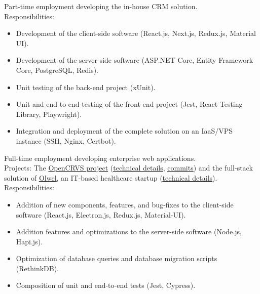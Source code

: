 \documentclass[10pt,a4paper,ragged2e]{altacv}
\begin{document}
\small Part-time employment developing the in-house CRM solution.\\
\smallskip
Responsibilities:
\begin{itemize}
\item Development of the client-side software (React.js, Next.js, Redux.js, Material UI).
\item Development of the server-side software (ASP.NET Core, Entity Framework Core, PostgreSQL, Redis).
\item Unit testing of the back-end project (xUnit).
\item Unit and end-to-end testing of the front-end project (Jest, React Testing Library, Playwright).
\item Integration and deployment of the complete solution on an IaaS/VPS instance (SSH, Nginx, Certbot).
\end{itemize}

\medskip

\small Full-time employment developing enterprise web applications.\\
\smallskip
\small Projects: The \href{https://www.dsinnovators.com/projects/open-crvs}{OpenCRVS project} (\href{https://www.dsinnovators.com/casestudies/open-crvs-2}{\underline{technical details}}, \href{https://github.com/opencrvs/opencrvs-core/commits?author=maacpiash}{\underline{commits}}) and the full-stack solution of \href{https://www.dsinnovators.com/projects/olwel}{\underline{Olwel}}, an IT-based healthcare startup (\href{https://www.dsinnovators.com/casestudies/olwel-2}{\underline{technical details}}).\\
\smallskip
Responsibilities:
\begin{itemize}
\item Addition of new components, features, and bug-fixes to the client-side software (React.js, Electron.js, Redux.js, Material-UI).
\item Addition features and optimizations to the server-side software (Node.js, Hapi.js).
\item Optimization of database queries and database migration scripts (RethinkDB).
\item Composition of unit and end-to-end tests (Jest, Cypress).
\end{itemize}
\end{document}
